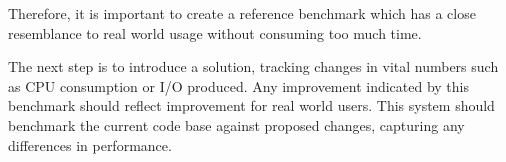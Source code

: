 Therefore, it is important to create a reference benchmark which has a close resemblance to real world usage without consuming too much time.

The next step is to introduce a solution, tracking changes in vital numbers such as CPU consumption or I/O produced.
Any improvement indicated by this benchmark should reflect improvement for real world users.
This system should benchmark the current code base against proposed changes, capturing any differences in performance.






